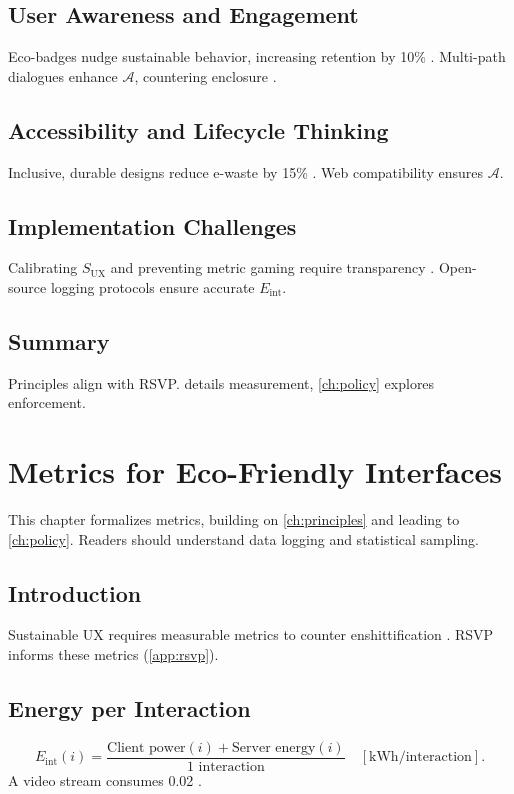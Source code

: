 \documentclass[openany]{book}
\newcommand{\Eint}{E_{\mathrm{int}}} %
\newcommand{\Auton}{\mathcal{A}} %
\newcommand{\SUX}{S_{\mathrm{UX}}} %
\newcommand{\kWh}{\mathrm{kWh}}
\begin{document}
\section{User Awareness and Engagement}
\label{sec:principles-awareness}
Eco-badges nudge sustainable behavior, increasing retention by 10\% \citep{colak2024}. Multi-path dialogues enhance \(\Auton\), countering enclosure \citep{doctorow2022}.

\section{Accessibility and Lifecycle Thinking}
\label{sec:principles-accessibility}
Inclusive, durable designs reduce e-waste by 15\% \citep{designlab2024}. Web compatibility ensures \(\Auton\).

\section{Implementation Challenges}
\label{sec:principles-challenges}
Calibrating \(\SUX\) and preventing metric gaming require transparency \citep{colak2024}. Open-source logging protocols ensure accurate \(\Eint\).

\section{Summary}
Principles align with RSVP.  details measurement, \cref{ch:policy} explores enforcement.

\chapter{Metrics for Eco-Friendly Interfaces}
\label{ch:metrics}

This chapter formalizes metrics, building on \cref{ch:principles} and leading to \cref{ch:policy}. Readers should understand data logging and statistical sampling.

\section{Introduction}
\label{sec:metrics-intro}
Sustainable UX requires measurable metrics to counter enshittification \citep{prigogine1984,doctorow2022}. RSVP informs these metrics (\cref{app:rsvp}).

\section{Energy per Interaction}
\label{sec:metrics-energy}
\begin{equation}
\label{eq:Eint}
\Eint(i) = \frac{\text{Client power}(i) + \text{Server energy}(i)}{\text{1 interaction}} \quad [\kWh/\text{interaction}].
\end{equation}
A video stream consumes \SI{0.02}{\kWh} \citep{extentia2024}.
\end{document}
